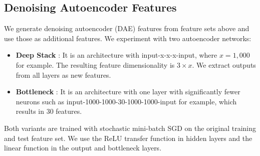 \subsection{Denoising Autoencoder Features}
We generate denoising autoencoder (DAE) \cite{hinton2006reducing} features from feature sets above and use those as additional features.  
We experiment with two autoencoder networks:
\begin{itemize}
  \setlength\itemsep{0em}
  \item \textbf{Deep Stack} \cite{vincent2010stacked}: It is an architecture with input-x-x-x-input, where $x=1,000$ for example.
The resulting feature dimensionality is $3 \times x$. We extract outputs from all layers as new features.
  \item \textbf{Bottleneck}  \cite{sainath2012auto} : It is an architecture with one layer with significantly fewer neurons such as input-1000-1000-30-1000-1000-input for example, which results in 30 features.
\end{itemize}
Both variants are trained with stochastic mini-batch SGD on the original training and test feature set.
We use the ReLU transfer function in hidden layers and the linear function in the output and bottleneck layers.
